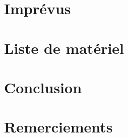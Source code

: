 \documentclass[
    iai, %
    mi, %
]{heig-tb}
\begin{document}
\chapter{Imprévus}


\chapter{Liste de matériel}


\chapter{Conclusion}


\chapter*{Remerciements}


\clearpage
\printbibliography

\appendix
\appendixpage
\addappheadtotoc

\let\cleardoublepage\clearpage
\backmatter

\label{glossaire}
\printnoidxglossary
\label{index}
\printindex




\end{document}
